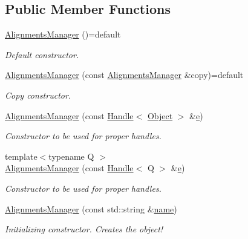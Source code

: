 \subsection*{Public Member Functions}
\begin{DoxyCompactItemize}
\item 
\hyperlink{class_d_d4hep_1_1_alignments_1_1_alignments_manager_aa1130b17ef8438d29172adb85c40f159}{Alignments\+Manager} ()=default
\begin{DoxyCompactList}\small\item\em Default constructor. \end{DoxyCompactList}\item 
\hyperlink{class_d_d4hep_1_1_alignments_1_1_alignments_manager_a14ef021c09811b2a436b705369b42b43}{Alignments\+Manager} (const \hyperlink{class_d_d4hep_1_1_alignments_1_1_alignments_manager}{Alignments\+Manager} \&copy)=default
\begin{DoxyCompactList}\small\item\em Copy constructor. \end{DoxyCompactList}\item 
\hyperlink{class_d_d4hep_1_1_alignments_1_1_alignments_manager_ae474e7e6cf841aa616b181f106c2cf67}{Alignments\+Manager} (const \hyperlink{class_d_d4hep_1_1_handle}{Handle}$<$ \hyperlink{class_d_d4hep_1_1_alignments_1_1_alignments_manager_a45f94880f4e49efe8e77ce6d8e45275f}{Object} $>$ \&\hyperlink{_volumes_8cpp_a8a9a1f93e9b09afccaec215310e64142}{e})
\begin{DoxyCompactList}\small\item\em Constructor to be used for proper handles. \end{DoxyCompactList}\item 
{\footnotesize template$<$typename Q $>$ }\\\hyperlink{class_d_d4hep_1_1_alignments_1_1_alignments_manager_a88279a1b55cbd3479cca393750371365}{Alignments\+Manager} (const \hyperlink{class_d_d4hep_1_1_handle}{Handle}$<$ Q $>$ \&\hyperlink{_volumes_8cpp_a8a9a1f93e9b09afccaec215310e64142}{e})
\begin{DoxyCompactList}\small\item\em Constructor to be used for proper handles. \end{DoxyCompactList}\item 
\hyperlink{class_d_d4hep_1_1_alignments_1_1_alignments_manager_a3f12cc68d9ff6cc3aa240c1fde507fc6}{Alignments\+Manager} (const std\+::string \&\hyperlink{class_d_d4hep_1_1_handle_a27c7d467a609ab32c133e1f3c7d85ef5}{name})
\begin{DoxyCompactList}\small\item\em Initializing constructor. Creates the object! \end{DoxyCompactList}\item 

\end{DoxyCompactItemize}
